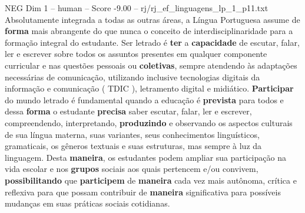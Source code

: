 \begin{textsample}{NEG Dim 1 – human – Score -9.00 – rj/rj\_ef\_linguagens\_lp\_1\_p11.txt}  \label{ex:f1_neg_001}
Absolutamente integrada a todas as outras áreas, a Língua Portuguesa assume de \textbf{forma} mais abrangente do que nunca o conceito de interdisciplinaridade para a formação integral do estudante.
Ser letrado é \textbf{ter} a \textbf{capacidade} de escutar, falar, ler e escrever sobre todos os assuntos presentes em qualquer componente curricular e nas questões pessoais ou \textbf{coletivas}, sempre atendendo às adaptações necessárias de comunicação, utilizando inclusive tecnologias digitais da informação e comunicação ( TDIC ), letramento digital e midiático. \textbf{Participar} do mundo letrado é fundamental quando a educação é \textbf{prevista} para todos e dessa \textbf{forma} o estudante \textbf{precisa} saber escutar, falar, ler e escrever, compreendendo, interpretando, \textbf{produzindo} e observando os aspectos culturais de sua língua materna, suas variantes, seus conhecimentos linguísticos, gramaticais, os gêneros textuais e suas estruturas, mas sempre à luz da linguagem.
Desta \textbf{maneira}, os estudantes podem ampliar sua participação na vida escolar e nos \textbf{grupos} sociais aos quais pertencem e/ou convivem, \textbf{possibilitando} que \textbf{participem} de \textbf{maneira} cada vez mais autônoma, crítica e reflexiva para que possam contribuir de \textbf{maneira} significativa para possíveis mudanças em suas práticas sociais cotidianas.

\end{textsample}
